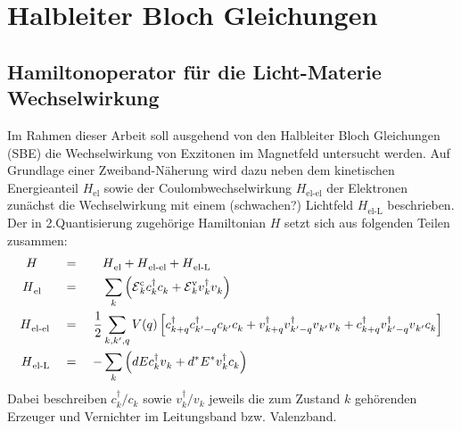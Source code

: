 \documentclass[a4paper,11pt]{article}
\newcommand{\ind}[2]{{_{#1}^{#2}}}
\newcommand{\+}{\dagger}
\newcommand{\E}{\mathcal{E}}
\renewcommand{\^}{\hat}
\renewcommand{\tt}{\text}
\renewcommand{\~}{\widetilde}
\begin{document}
\section{Halbleiter Bloch Gleichungen}
\subsection{Hamiltonoperator für die Licht-Materie Wechselwirkung}
Im Rahmen dieser Arbeit soll ausgehend von den Halbleiter Bloch Gleichungen (SBE) die Wechselwirkung von Exzitonen im Magnetfeld untersucht werden. Auf Grundlage einer Zweiband-Näherung wird dazu neben dem kinetischen Energieanteil $H\ind{\tt{el}}{}$ sowie der Coulombwechselwirkung $H\ind{\tt{el-el}}{}$ der Elektronen zunächst die Wechselwirkung mit einem (schwachen?) Lichtfeld $H\ind{\tt{el-L}}{}$ beschrieben. Der in 2.Quantisierung zugehörige Hamiltonian $H$ setzt sich aus folgenden Teilen zusammen: 
\begin{alignat*}{3}
H \quad  				&&\ = \ && &H\ind{\tt{el}}{} +H\ind{\tt {el-el}}{}+H\ind{\tt {el-L}}{} \\
H\ind{\tt{el}}{} 	\ \	&&\ = \ && &\sum_k\left (			\E \ind{k}{\tt c} c\ind{k}{\+}c\ind{k}{} +\E \ind{k}{\tt {v}}v\ind{k}{\+}v\ind{k}{}    	\right ) \\
H\ind{\tt {el-el}}{} &&\ = \ &&\frac{1}{2}&\sum_{k,k',q} V(q)\left [			c\ind{k+q}{\+} c\ind{k'-q}{\+}c\ind{k'}{}c\ind{k}{} +v\ind{k+q}{\+}v\ind{k'-q}{\+}v\ind{k'}{}v\ind{k}{}   +  	 	c\ind{k+q}{\+}v\ind{k'-q}{\+}v\ind{k'}{}c\ind{k}{}    	\right ] \\
H\ind{\tt {el-L}}{} 	&&\ = \ && -&\sum_{k} \left (dE c\ind{k}{\+}v\ind{k}{} + d^*E^*v\ind{k}{\+}c\ind{k}{}\right ) 
\end{alignat*}
Dabei beschreiben $c\ind{k}{\+}/c\ind{k}{}$ sowie $v\ind{k}{\+}/v\ind{k}{}$ jeweils die zum Zustand $k$ gehörenden Erzeuger und Vernichter im Leitungsband bzw. Valenzband. 
\end{document}
